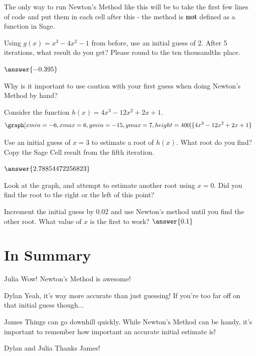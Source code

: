\documentclass{ximera}
\begin{document}
The only way to run Newton's Method like this will be to take the first few lines of code and put them in each cell after this - the method is \textbf{not} defined as a function in Sage.

\begin{question}
Using $g(x) = x^3 -4x^2-1$ from before, use an initial guess of 2. After 5 iterations, what result do you get? Please round to the ten thousandths place.

\begin{onlineOnly}
\begin{sageCell}

\end{sageCell}
\end{onlineOnly}

$\answer{-0.395}$

Why is it important to use caution with your first guess when doing Newton's Method by hand?
\begin{freeResponse}
\end{freeResponse}
\end{question}

\begin{question}
Consider the function $h(x) = 4x^3 - 12x^2 + 2x + 1$.
\[
\graph[xmin=-6,xmax=6,ymin=-15,ymax=7,height=400]{4x^3 - 12x^2 + 2x + 1}
\]
\begin{onlineOnly}
\begin{sageCell}

\end{sageCell}
\end{onlineOnly}


Use an initial guess of $x=3$ to estimate a root of $h(x)$. What root do you find? Copy the Sage Cell result from the fifth iteration.

$\answer{2.78854472256823}$

Look at the graph, and attempt to estimate another root using $x = 0$. Did you find the root to the right or the left of this point?

\begin{multipleChoice}
\end{multipleChoice}

Increment the initial guess by $0.02$ and use Newton's method until you find the other root. What value of $x$ is the first to work?
$\answer{0.1}$
\end{question}

\section{In Summary}
\begin{dialogue}
\item[Julia] Wow! Newton's Method is awesome!
\item[Dylan] Yeah, it's way more accurate than just guessing! If you're too far off on that initial guess though...
\item[James] Things can go downhill quickly. While Newton's Method can be handy, it's important to remember how important an accurate initial estimate is!
\item[Dylan and Julia] Thanks James!
\end{dialogue}
\end{document}

